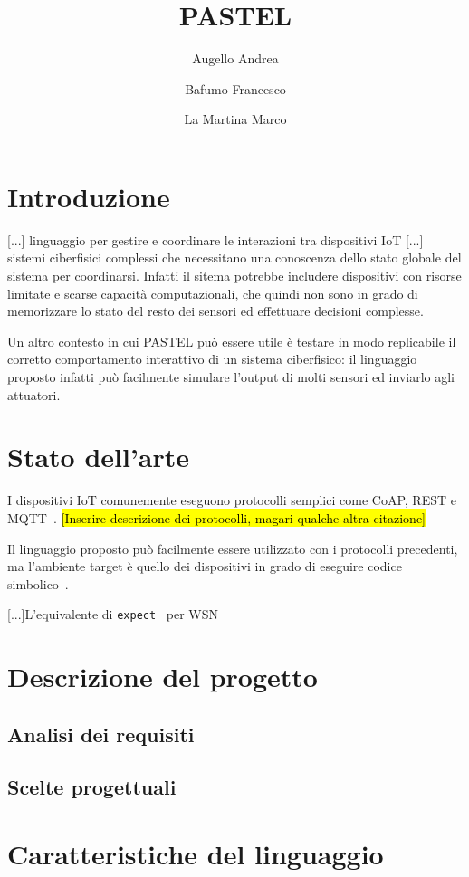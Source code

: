 \documentclass[]{article}
\title{PASTEL}
\author{{Augello Andrea} \and {Bafumo Francesco} \and{La Martina Marco}}
\newcommand{\hlc}[2][yellow]{ {\sethlcolor{#1} \hl{#2}} }
\begin{document}
\maketitle

\section{Introduzione}

{[...]} linguaggio per gestire e coordinare le interazioni tra dispositivi IoT [...] sistemi ciberfisici complessi che necessitano una conoscenza dello stato globale del sistema per coordinarsi. Infatti il sitema potrebbe includere dispositivi con risorse limitate e scarse capacità computazionali, che quindi non sono in grado di memorizzare lo stato del resto dei sensori ed effettuare decisioni complesse. 

Un altro contesto in cui PASTEL può essere utile è testare in modo replicabile il corretto comportamento interattivo di un sistema ciberfisico: il linguaggio proposto infatti può facilmente simulare l'output di molti sensori ed inviarlo agli attuatori.


\section{Stato dell'arte}

I dispositivi IoT comunemente eseguono protocolli semplici come CoAP, REST e MQTT~\cite{tandale2017empirical}. \hlc[cyan]{[Inserire descrizione dei protocolli, magari qualche altra citazione]}

Il linguaggio proposto può facilmente essere utilizzato con i protocolli precedenti, ma l'ambiente target è quello dei dispositivi in grado di eseguire codice simbolico~\cite{gaglio2017dc4cd}.  

[...]L'equivalente di \texttt{expect}~\cite{libes1991expect, libes1990expect} per WSN

\section{Descrizione del progetto}
\subsection{Analisi dei requisiti}
\subsection{Scelte progettuali}
\section{Caratteristiche del linguaggio}
\end{document}
